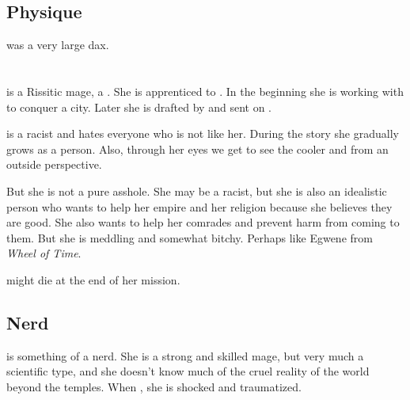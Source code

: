 \subsection{Physique}
\Narkiza was a very large dax.















\section{\Shilred}
\Shilred{} is a Rissitic mage, a \Shessefkesad. She is apprenticed to \Dzasselid{}. In the beginning she is working with \Dzasselid{} to conquer a \Scyric{} city. Later she is drafted by \Ishnaruchaefir{} and sent on . 

\Shilred{} is a racist and hates everyone who is not like her. During the story she gradually grows as a person. Also, through her eyes we get to see the cooler \Dzasselid{} and \Ishnaruchaefir{} from an outside perspective. 

But she is not a pure asshole. She may be a racist, but she is also an idealistic person who wants to help her empire and her religion because she believes they are good. She also wants to help her comrades and prevent harm from coming to them. But she is meddling and somewhat bitchy. Perhaps like Egwene from \emph{Wheel of Time}. 

\Shilred{} might die at the end of her mission. 









\subsection{Nerd}
\Shilred{} is something of a nerd. 
She is a strong and skilled mage, but very much a scientific type, and she doesn't know much of the cruel reality of the world beyond the temples. 
When , she is shocked and traumatized. 









